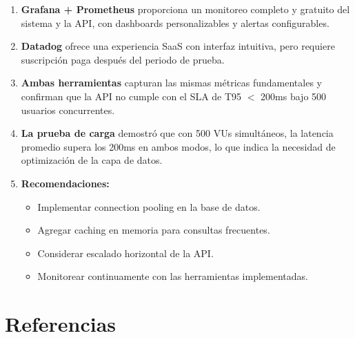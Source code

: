 \documentclass[12pt, a4paper]{article}
\begin{document}
\begin{enumerate}
    \item \textbf{Grafana + Prometheus} proporciona un monitoreo completo y gratuito del sistema y la API, con dashboards personalizables y alertas configurables.
    
    \item \textbf{Datadog} ofrece una experiencia SaaS con interfaz intuitiva, pero requiere suscripción paga después del periodo de prueba.
    
    \item \textbf{Ambas herramientas} capturan las mismas métricas fundamentales y confirman que la API no cumple con el SLA de T95 $<$ 200ms bajo 500 usuarios concurrentes.
    
    \item \textbf{La prueba de carga} demostró que con 500 VUs simultáneos, la latencia promedio supera los 200ms en ambos modos, lo que indica la necesidad de optimización de la capa de datos.
    
    \item \textbf{Recomendaciones:}
    \begin{itemize}
        \item Implementar connection pooling en la base de datos.
        \item Agregar caching en memoria para consultas frecuentes.
        \item Considerar escalado horizontal de la API.
        \item Monitorear continuamente con las herramientas implementadas.
    \end{itemize}
\end{enumerate}

\newpage

\section*{Referencias}
\end{document}
